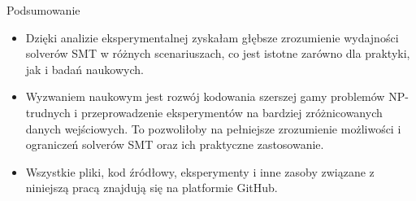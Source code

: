 \begin{frame}{Podsumowanie}
\begin{itemize}
	\item Dzięki analizie eksperymentalnej zyskałam głębsze zrozumienie wydajności solverów SMT w różnych scenariuszach, co jest istotne zarówno dla praktyki, jak i badań naukowych. 
	\item Wyzwaniem naukowym jest rozwój kodowania szerszej gamy problemów NP-trudnych i przeprowadzenie eksperymentów na bardziej zróżnicowanych danych wejściowych. To pozwoliłoby na pełniejsze zrozumienie możliwości i ograniczeń solverów SMT oraz ich praktyczne zastosowanie.
	\item Wszystkie pliki, kod źródłowy, eksperymenty i inne zasoby związane z niniejszą pracą znajdują się na platformie GitHub.
\end{itemize}
\end{frame}
	